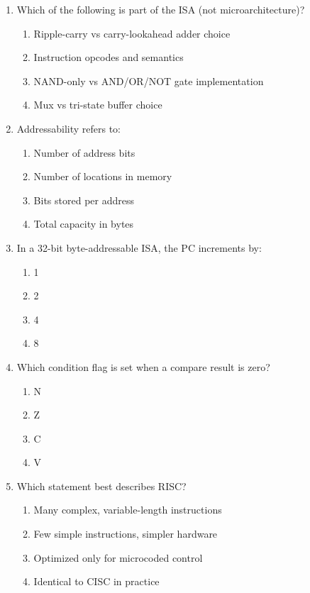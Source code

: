 \documentclass[11pt]{article}
\begin{document}
\begin{enumerate}[label=\textbf{A\arabic*.}]
  \item Which of the following is part of the ISA (not microarchitecture)?
  \begin{enumerate}[label=(\Alph*)]
    \item Ripple-carry vs carry-lookahead adder choice
    \item Instruction opcodes and semantics
    \item NAND-only vs AND/OR/NOT gate implementation
    \item Mux vs tri-state buffer choice
  \end{enumerate}

  \item Addressability refers to:
  \begin{enumerate}[label=(\Alph*)]
    \item Number of address bits
    \item Number of locations in memory
    \item Bits stored per address
    \item Total capacity in bytes
  \end{enumerate}

  \item In a 32-bit byte-addressable ISA, the PC increments by:
  \begin{enumerate}[label=(\Alph*)]
    \item 1
    \item 2
    \item 4
    \item 8
  \end{enumerate}

  \item Which condition flag is set when a compare result is zero?
  \begin{enumerate}[label=(\Alph*)]
    \item N
    \item Z
    \item C
    \item V
  \end{enumerate}

  \item Which statement best describes RISC?
  \begin{enumerate}[label=(\Alph*)]
    \item Many complex, variable-length instructions
    \item Few simple instructions, simpler hardware
    \item Optimized only for microcoded control
    \item Identical to CISC in practice
  \end{enumerate}


\end{enumerate}
\end{document}
